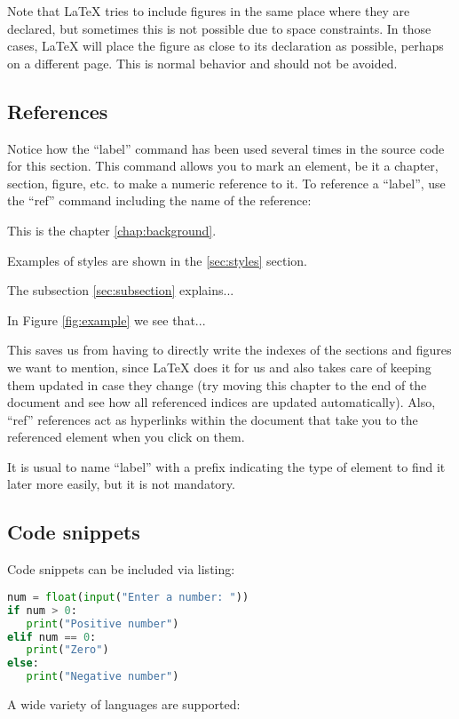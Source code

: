 Note that LaTeX tries to include figures in the same place where they are declared, but sometimes this is not possible due to space constraints. In those cases, LaTeX will place the figure as close to its declaration as possible, perhaps on a different page. This is normal behavior and should not be avoided.

\subsection{References}
Notice how the ``label'' command has been used several times in the source code for this section. This command allows you to mark an element, be it a chapter, section, figure, etc. to make a numeric reference to it. To reference a ``label'', use the ``ref'' command including the name of the reference:

This is the chapter \ref{chap:background}.

Examples of styles are shown in the \ref{sec:styles} section.

The subsection \ref{sec:subsection} explains...

In Figure \ref{fig:example} we see that...

This saves us from having to directly write the indexes of the sections and figures we want to mention, since LaTeX does it for us and also takes care of keeping them updated in case they change (try moving this chapter to the end of the document and see how all referenced indices are updated automatically). Also, ``ref'' references act as hyperlinks within the document that take you to the referenced element when you click on them.

It is usual to name ``label'' with a prefix indicating the type of element to find it later more easily, but it is not mandatory.

\subsection{Code snippets}

Code snippets can be included via listing:

\begin{lstlisting}[language=Python, caption={Python code}, label={cod:python}, captionpos=b]
num = float(input("Enter a number: "))
if num > 0:
   print("Positive number")
elif num == 0:
   print("Zero")
else:
   print("Negative number")
\end{lstlisting}

A wide variety of languages are supported:

